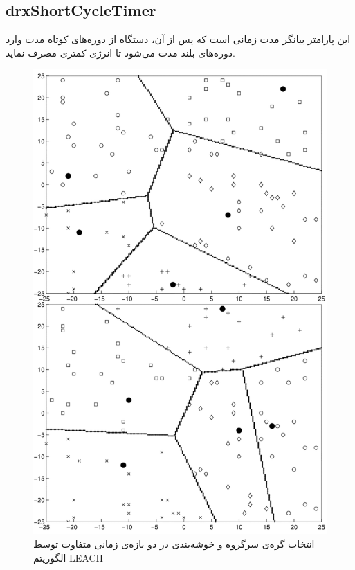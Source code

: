 \subsection{drxShortCycleTimer}
این پارامتر بیانگر مدت زمانی است که پس از آن، دستگاه از دوره‌های کوتاه مدت وارد دوره‌های بلند مدت می‌شود تا انرژی کمتری مصرف نماید.

\begin{figure}
	\centering
	\includegraphics[width=0.7\linewidth]{figs/leach}
	\caption {انتخاب گره‌ی سرگروه و خوشه‌بندی در دو بازه‌ی زمانی متفاوت توسط الگوریتم LEACH}
	\label{fig:leach}
\end{figure}

